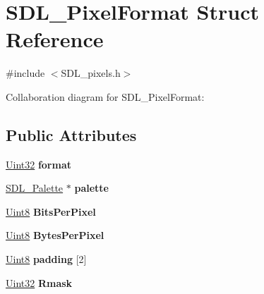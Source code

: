 \hypertarget{struct_s_d_l___pixel_format}{}\section{S\+D\+L\+\_\+\+Pixel\+Format Struct Reference}
\label{struct_s_d_l___pixel_format}


{\ttfamily \#include $<$S\+D\+L\+\_\+pixels.\+h$>$}



Collaboration diagram for S\+D\+L\+\_\+\+Pixel\+Format\+:
\subsection*{Public Attributes}
\begin{DoxyCompactItemize}
\item 
\hypertarget{struct_s_d_l___pixel_format_a44045e1da843f3d1fad3a608e16af712}{}\hyperlink{_s_d_l__stdinc_8h_add440eff171ea5f55cb00c4a9ab8672d}{Uint32} {\bfseries format}\label{struct_s_d_l___pixel_format_a44045e1da843f3d1fad3a608e16af712}

\item 
\hypertarget{struct_s_d_l___pixel_format_aeae611aba76f5eb11b696807926c5116}{}\hyperlink{struct_s_d_l___palette}{S\+D\+L\+\_\+\+Palette} $\ast$ {\bfseries palette}\label{struct_s_d_l___pixel_format_aeae611aba76f5eb11b696807926c5116}

\item 
\hypertarget{struct_s_d_l___pixel_format_aac533fae3043ef44df01108248e111d8}{}\hyperlink{_s_d_l__stdinc_8h_a2944638813a090aa23e62f4da842c3e2}{Uint8} {\bfseries Bits\+Per\+Pixel}\label{struct_s_d_l___pixel_format_aac533fae3043ef44df01108248e111d8}

\item 
\hypertarget{struct_s_d_l___pixel_format_a6fec9e1809cc3da458d58b8cccd058f2}{}\hyperlink{_s_d_l__stdinc_8h_a2944638813a090aa23e62f4da842c3e2}{Uint8} {\bfseries Bytes\+Per\+Pixel}\label{struct_s_d_l___pixel_format_a6fec9e1809cc3da458d58b8cccd058f2}

\item 
\hypertarget{struct_s_d_l___pixel_format_a1f4e276fbda82e60eaff28f61c7cd19e}{}\hyperlink{_s_d_l__stdinc_8h_a2944638813a090aa23e62f4da842c3e2}{Uint8} {\bfseries padding} \mbox{[}2\mbox{]}\label{struct_s_d_l___pixel_format_a1f4e276fbda82e60eaff28f61c7cd19e}

\item 
\hypertarget{struct_s_d_l___pixel_format_a35e5793f6e9c356aec2d130167174946}{}\hyperlink{_s_d_l__stdinc_8h_add440eff171ea5f55cb00c4a9ab8672d}{Uint32} {\bfseries Rmask}\label{struct_s_d_l___pixel_format_a35e5793f6e9c356aec2d130167174946}


\end{DoxyCompactItemize}
